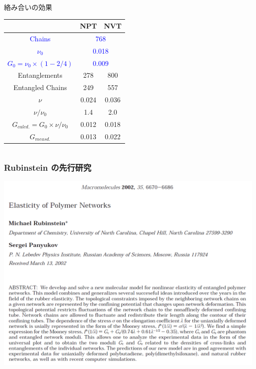 \documentclass[12pt, dvipdfmx]{beamer}
\begin{document}
\begin{frame}
\begin{columns}[T, onlytextwidth]
\begin{block}{絡み合いの効果}
                \vspace{-3mm}
                \scriptsize
                \begin{center}
                    \begin{tabular}{c|c|c} \hline
                        &NPT & NVT \\ \hline \hline
                        \textcolor{blue}{Chains} & \multicolumn{2}{|c}{\textcolor{blue}{768}}\\ \hline
                        \textcolor{blue}{$\nu_0$}& \multicolumn{2}{|c}{\textcolor{blue}{0.018}}\\ \hline
                        \textcolor{blue}{$G_0 = \nu_0\times (1-2/4)$}&\multicolumn{2}{|c}{\textcolor{blue}{0.009}} \\ \hline \hline
                        Entanglements& 278& 800\\ \hline
                        Entangled Chains&249&557 \\ \hline
                        \alert{$\nu$}& \alert{0.024}&\alert{0.036}\\ \hline
                        $\nu/\nu_0$& 1.4& 2.0 \\ \hline
                        $G_{calcd.}=G_0 \times \nu/\nu_0$ & \alert{0.012} & 0.018 \\ \hline \hline
                        $G_{measd.}$ & \alert{0.013} & 0.022 \\ \hline
                    \end{tabular}
                \end{center}
            \end{block}
        \end{columns}
\end{frame}

\begin{frame}
    \frametitle{Rubinstein の先行研究}
        \begin{center}
            \includegraphics[width=.8\textwidth]{./rubinstein_1.png}
        \end{center}
\end{frame}
\end{document}
